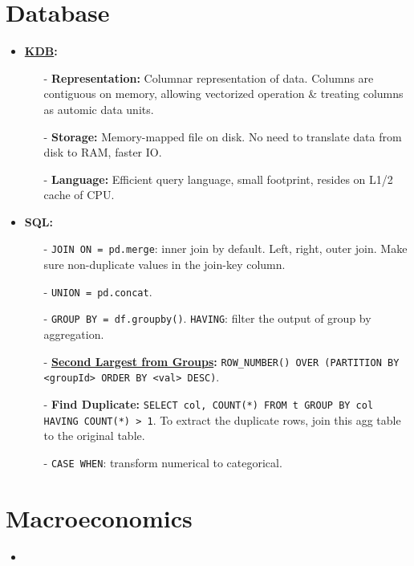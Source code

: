 \documentclass[9pt, landscape]{article}
\begin{document}
\begin{multicols*}{3}
\section{Database}
\begin{itemize}
	\item \textbf{\href{https://kx.com/blog/what-makes-time-series-database-kdb-so-fast/}{KDB}:} 
	\begin{itemize}[leftmargin=10pt,noitemsep,topsep=0pt,partopsep=0pt]
		\item[-] \textbf{Representation:} Columnar representation of data. Columns are contiguous on memory, allowing vectorized operation \& treating columns as automic data units.
		\item[-] \textbf{Storage:} Memory-mapped file on disk. No need to translate data from disk to RAM, faster IO.
		\item[-] \textbf{Language:} Efficient query language, small footprint, resides on L1/2 cache of CPU.
	\end{itemize}
	\item \textbf{SQL:} 
	\begin{itemize}[leftmargin=10pt,noitemsep,topsep=0pt,partopsep=0pt]
		\item[-] \texttt{JOIN ON = pd.merge}: inner join by default. Left, right, outer join. Make sure non-duplicate values in the join-key column. 
		\item[-] \texttt{UNION = pd.concat}.
		\item[-] \texttt{GROUP BY = df.groupby()}. \texttt{HAVING}: filter the output of group by aggregation.
		\item[-] \textbf{\href{https://stackoverflow.com/questions/30099821/query-to-find-second-largest-value-from-every-group}{Second Largest from Groups}:} \texttt{ROW\_NUMBER() OVER (PARTITION BY <groupId> ORDER BY <val> DESC)}.
		\item[-] \textbf{Find Duplicate:} \texttt{SELECT col, COUNT(*) FROM t GROUP BY col HAVING COUNT(*) > 1}. To extract the duplicate rows, join this agg table to the original table.
		\item[-] \texttt{CASE WHEN}: transform numerical to categorical. 
	\end{itemize}
\end{itemize}
\section{Macroeconomics}
\begin{itemize}
	\item 
\end{itemize}


\end{multicols*}
\end{document}
